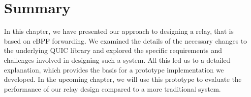 \section{Summary}\label{sec:summary_ch3}

In this chapter, we have presented our approach to designing a relay, that 
is based on eBPF forwarding.
We examined the details of the necessary changes to the underlying QUIC library 
and explored the specific requirements and challenges involved in designing such a system.
All this led us to a detailed explanation, which provides the basis for a 
prototype implementation we developed.
In the upcoming chapter, we will use this prototype to evaluate the 
performance of our relay design compared to a more traditional system.